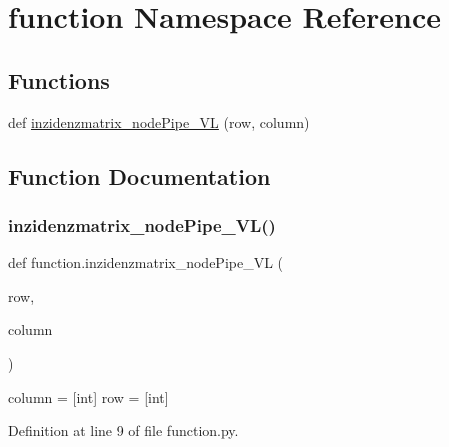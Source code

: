 \hypertarget{namespacefunction}{}\section{function Namespace Reference}
\label{namespacefunction}
\subsection*{Functions}
\begin{DoxyCompactItemize}
\item 
def \hyperlink{namespacefunction_a8dc2cfc1738c5c64a321bfaa3a5d93d6}{inzidenzmatrix\+\_\+node\+Pipe\+\_\+\+VL} (row, column)
\end{DoxyCompactItemize}


\subsection{Function Documentation}
\mbox{\label{namespacefunction_a8dc2cfc1738c5c64a321bfaa3a5d93d6}} 
\subsubsection{\texorpdfstring{inzidenzmatrix\+\_\+node\+Pipe\+\_\+\+V\+L()}{inzidenzmatrix\_nodePipe\_VL()}}
{\footnotesize\ttfamily def function.\+inzidenzmatrix\+\_\+node\+Pipe\+\_\+\+VL (\begin{DoxyParamCaption}\item[{}]{row,  }\item[{}]{column }\end{DoxyParamCaption})}

\begin{DoxyVerb}column = [int]
row = [int]
\end{DoxyVerb}
 

Definition at line 9 of file function.\+py.

